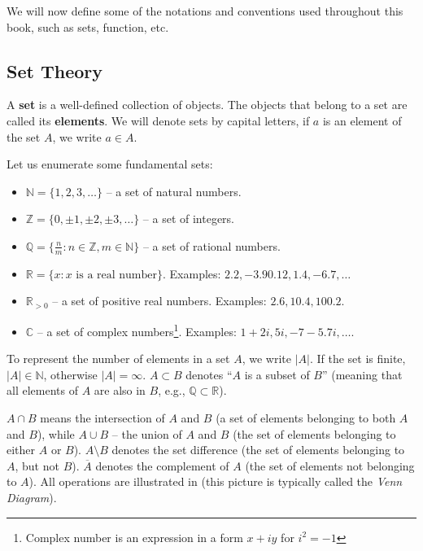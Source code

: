 \documentclass[../lecture-notes-148x210.tex]{subfiles}
\begin{document}
We will now define some of the notations and conventions used throughout this book, such as sets, function, etc.

\subsection*{Set Theory}

A \textbf{set} is a well-defined collection of objects. The objects that belong to a set are called 
its \textbf{elements}. We will denote sets by capital letters, if $a$ is an element of the set $A$, 
we write $a \in A$.

Let us enumerate some fundamental sets:

\begin{itemize}
    \item $\mathbb{N} = \{1, 2, 3, \dots\}$ -- a set of natural numbers.
    \item $\mathbb{Z} = \{0, \pm 1, \pm 2, \pm 3, \dots\}$ -- a set of integers.
    \item $\mathbb{Q} = \{\frac{n}{m}: n \in \mathbb{Z}, m \in \mathbb{N}\}$ -- a set of rational numbers.
    \item $\mathbb{R} = \{x : x \text{ is a real number}\}$. Examples: $2.2, -3.9 0.12, 1.4, -6.7, \dots$
    \item $\mathbb{R}_{>0}$ -- a set of positive real numbers. Examples: $2.6, 10.4, 100.2$.
    \item $\mathbb{C}$ -- a set of complex numbers\footnote{Complex number is an expression in a form $x+iy$ for $i^2=-1$}. 
    Examples: $1+2i, 5i, -7-5.7i, \dots$.
\end{itemize}

To represent the number of elements in a set $A$, we write $|A|$. If the set is finite, $|A| \in \mathbb{N}$, 
otherwise $|A| = \infty$. $A \subset B$ denotes ``$A$ is a subset of $B$'' (meaning that all elements of $A$ 
are also in $B$, e.g., $\mathbb{Q} \subset \mathbb{R}$).

$A \cap B$ means the intersection of $A$ and $B$ (a set of elements belonging to both $A$ and $B$), while 
$A \cup B$ -- the union of $A$ and $B$ (the set of elements belonging to either $A$ or $B$). $A \setminus B$ 
denotes the set difference (the set of elements belonging to $A$, but not $B$). $\overline{A}$ denotes the 
complement of $A$ (the set of elements not belonging to $A$). All operations are illustrated in 
 (this picture is typically called the \textit{Venn Diagram}).
\end{document}
